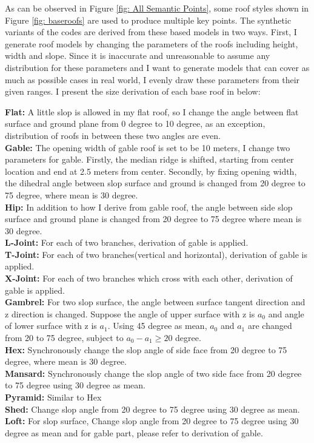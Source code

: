 \documentclass{iitthesis}
\begin{document}
As can be observed in Figure \ref{fig: All Semantic Points}, some roof styles shown in Figure \ref{fig: baseroofs} are used to produce multiple key points. The synthetic variants of the codes are derived from these based models in two ways. First, I generate roof models by changing the parameters of the roofs including height, width and slope. Since it is inaccurate and unreasonable to assume any distribution for these parameters and I want to generate models that can cover as much as possible cases in real world, I evenly draw these parameters from their given ranges. I present the size derivation of each base roof in below:

{\noindent \textbf{Flat:}} A little slop is allowed in my flat roof, so I change the angle between flat surface and ground plane from 0 degree to 10 degree, as an exception, distribution of roofs in between these two angles are even.
\\ \textbf{Gable:} The opening width of gable roof is set to be 10 meters, I change two parameters for gable. Firstly, the median ridge is shifted, starting from center location and end at 2.5 meters from center. Secondly, by fixing opening width, the dihedral angle between slop surface and ground is changed from 20 degree to 75 degree, where mean is 30 degree.
\\ \textbf{Hip:} In addition to how I derive from gable roof, the angle between side slop surface and ground plane is changed from 20 degree to 75 degree where mean is 30 degree.
\\ \textbf{L-Joint:} For each of two branches, derivation of gable is applied.
\\ \textbf{T-Joint:} For each of two branches(vertical and horizontal), derivation of gable is applied.
\\ \textbf{X-Joint:} For each of two branches which cross with each other, derivation of gable is applied.
\\ \textbf{Gambrel:} For two slop surface, the angle between surface tangent direction and z direction is changed. Suppose the angle of upper surface with z is $a_0$ and angle of lower surface with z is $a_1$. Using 45 degree as mean, $a_0$ and $a_1$ are changed from 20 to 75 degree, subject to $a_0-a_1\geq 20$ degree.
\\ \textbf{Hex:} Synchronously change the slop angle of side face from 20 degree to 75 degree, where mean is 30 degree.
\\ \textbf{Mansard:} Synchronously change the slop angle of two side face from 20 degree to 75 degree using 30 degree as mean.
\\ \textbf{Pyramid:} Similar to Hex
\\ \textbf{Shed:} Change slop angle from 20 degree to 75 degree using 30 degree as mean.
\\ \textbf{Loft:} For slop surface, Change slop angle from 20 degree to 75 degree using 30 degree as mean and for gable part, please refer to derivation of gable.
\end{document}
